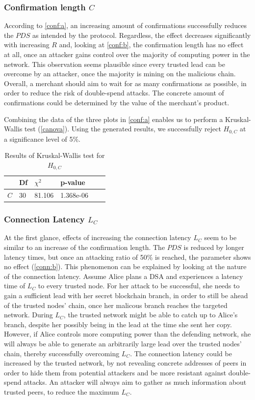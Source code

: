 \documentclass[a4paper,12pt,twoside]{report}
\begin{document}
\subsubsection{Confirmation length $C$} \label{consdisc}
According to \autoref{conf:a}, an increasing amount of confirmations successfully reduces the $PDS$ as intended by the protocol. Regardless, the effect decreases significantly with increasing $R$ and, looking at \autoref{conf:b}, the confirmation length has no effect at all, once an attacker gains control over the majority of computing power in the network. This observation seems plausible since every trusted lead can be overcome by an attacker, once the majority is mining on the malicious chain. Overall, a merchant should aim to wait for as many confirmations as possible, in order to reduce the risk of double-spend attacks. The concrete amount of confirmations could be determined by the value of the merchant's product.

Combining the data of the three plots in \autoref{conf:a} enables us to perform a Kruskal-Wallis test (\autoref{canova}). Using the generated results, we successfully reject $H_{0,C}$ at a significance level of 5\%.
\begin{table}[hb]
\centering
\begin{tabular}{|l|l|l|l|l|l|} \hline
& Df & $\chi^{2}$ & p-value \\ \hline
$C$ & 30 & 81.106 & 1.368e-06 \\ \hline
\end{tabular}
\caption{Results of Kruskal-Wallis test for $H_{0,C}$}
\label{canova}
\end{table}
\subsubsection{Connection Latency $L_C$} \label{connlatsec}
At the first glance, effects of increasing the connection latency $L_C$ seem to be similar to an increase of the confirmation length. The $PDS$ is reduced by longer latency times, but once an attacking ratio of 50\% is reached, the parameter shows no effect (\autoref{conn:b}). This phenomenon can be explained by looking at the nature of the connection latency. Assume Alice plans a DSA and experiences a latency time of $L_C$ to every trusted node. For her attack to be successful, she needs to gain a sufficient lead with her secret blockchain branch, in order to still be ahead of the trusted nodes' chain, once her malicous branch reaches the targeted network. During $L_C$, the trusted network might be able to catch up to Alice's branch, despite her possibly being in the lead at the time she sent her copy. However, if Alice controls more computing power than the defending network, she will always be able to generate an arbitrarily large lead over the trusted nodes' chain, thereby successfully overcoming $L_C$. The connection latency could be increased by the trusted network, by not revealing concrete addresses of peers in order to hide them from potential attackers and be more resistant against double-spend attacks. An attacker will always aim to gather as much information about trusted peers, to reduce the maximum $L_C$.
\end{document}
